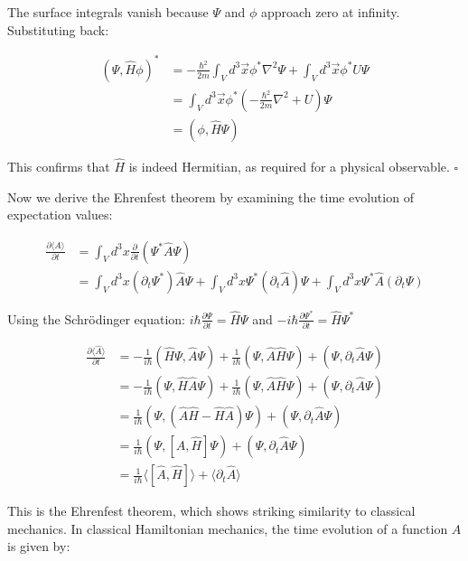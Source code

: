 \documentclass[italian]{HKNdocument}
\begin{document}
The surface integrals vanish because $\Psi$ and $\phi$ approach zero at infinity. Substituting back:

\begin{align}
(\Psi, \hat{H}\phi)^* &= -\frac{\hbar^2}{2m}\int_V d^3\vec{x}\phi^*\nabla^2\Psi + \int_V d^3\vec{x}\phi^*U\Psi \\
&= \int_V d^3\vec{x}\phi^*\left(-\frac{\hbar^2}{2m}\nabla^2 + U\right)\Psi \\
&= (\phi, \hat{H}\Psi) \label{eq:1.85}
\end{align}

This confirms that $\hat{H}$ is indeed Hermitian, as required for a physical observable. $\square$

Now we derive the Ehrenfest theorem by examining the time evolution of expectation values:

\begin{align}
\frac{\partial\langle\hat{A}\rangle}{\partial t} &= \int_V d^3x\frac{\partial}{\partial t}(\Psi^*\hat{A}\Psi) \\
&= \int_V d^3x(\partial_t\Psi^*)\hat{A}\Psi + \int_V d^3x\Psi^*(\partial_t\hat{A})\Psi + \int_V d^3x\Psi^*\hat{A}(\partial_t\Psi) \label{eq:1.86}
\end{align}

Using the Schrödinger equation:
$i\hbar\frac{\partial\Psi}{\partial t} = \hat{H}\Psi$ and $-i\hbar\frac{\partial\Psi^*}{\partial t} = \hat{H}\Psi^*$

\begin{align}
\frac{\partial\langle\hat{A}\rangle}{\partial t} &= -\frac{1}{i\hbar}(\hat{H}\Psi, \hat{A}\Psi) + \frac{1}{i\hbar}(\Psi, \hat{A}\hat{H}\Psi) + (\Psi, \partial_t\hat{A}\Psi) \\
&= -\frac{1}{i\hbar}(\Psi, \hat{H}\hat{A}\Psi) + \frac{1}{i\hbar}(\Psi, \hat{A}\hat{H}\Psi) + (\Psi, \partial_t\hat{A}\Psi) \\
&= \frac{1}{i\hbar}(\Psi, (\hat{A}\hat{H} - \hat{H}\hat{A})\Psi) + (\Psi, \partial_t\hat{A}\Psi) \label{eq:1.87} \\
&= \frac{1}{i\hbar}(\Psi, [\hat{A}, \hat{H}]\Psi) + (\Psi, \partial_t\hat{A}\Psi) \\
&= \frac{1}{i\hbar}\langle[\hat{A}, \hat{H}]\rangle + \langle\partial_t\hat{A}\rangle
\end{align}

This is the Ehrenfest theorem, which shows striking similarity to classical mechanics. In classical Hamiltonian mechanics, the time evolution of a function $A$ is given by:
\end{document}
